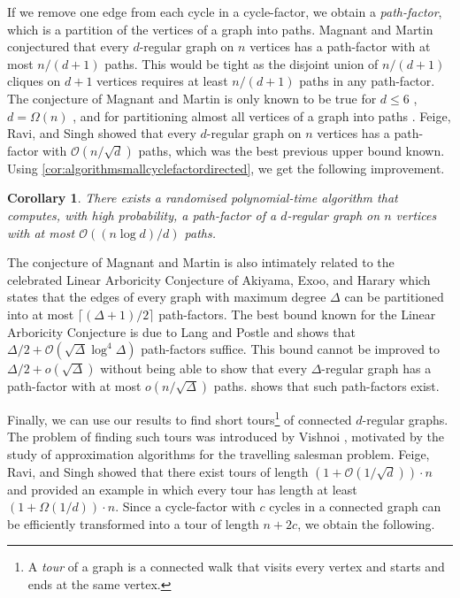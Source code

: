 \documentclass[11pt]{article}
\theoremstyle{plain}
\newtheorem{corollary}[theorem]{Corollary}
\theoremstyle{definition}
\newcommand{\cO}{\mathcal O}
\begin{document}
If we remove one edge from each cycle in a cycle-factor, we obtain a \emph{path-factor}, which is a partition of the vertices of a graph into paths. Magnant and Martin \cite{magnant2009note} conjectured that every $d$-regular graph on $n$ vertices has a path-factor with at most $n/(d+1)$ paths. This would be tight as the disjoint union of $n/(d+1)$ cliques on $d+1$ vertices requires at least $n/(d+1)$ paths in any path-factor. The conjecture of Magnant and Martin is only known to be true for $d \le 6$ \cite{magnant2009note,feige2022path}, $d = \Omega(n)$ \cite{gruslys2021cycle}, and for partitioning almost all vertices of a graph into paths \cite{montgomery2024approximate,letzter2025nearly}. Feige, Ravi, and Singh \cite{feige2014short} showed that every $d$-regular graph on $n$ vertices has a path-factor with $\cO(n/\!\sqrt{d})$ paths, which was the best previous upper bound known. Using \cref{cor:algorithmsmallcyclefactordirected}, we get the following improvement.

\begin{corollary}\label{thm:smallpathfactor}
    There exists a randomised polynomial-time algorithm that computes, with high probability, a path-factor of a $d$-regular graph on $n$ vertices with at most $\cO((n\log d)/d)$ paths.
\end{corollary}

The conjecture of Magnant and Martin is also intimately related to the celebrated Linear Arboricity Conjecture of Akiyama, Exoo, and Harary \cite{akiyama1980covering} which states that the edges of every graph with maximum degree $\Delta$ can be partitioned into at most $\lceil (\Delta+1)/2 \rceil$ path-factors. The best bound known for the Linear Arboricity Conjecture is due to Lang and Postle \cite{lang2023improved} and shows that $\Delta/2 + \cO(\sqrt{\Delta} \log^4 \Delta)$ path-factors suffice. This bound cannot be improved to $\Delta/2 + o(\sqrt{\Delta})$ without being able to show that every $\Delta$-regular graph has a path-factor with at most $o(n/\!\sqrt{\Delta})$ paths.  shows that such path-factors exist.
 
Finally, we can use our results to find short tours\footnote{A \emph{tour} of a graph is a connected walk that visits every vertex and starts and ends at the same vertex.} of connected $d$-regular graphs. The problem of finding such tours was introduced by Vishnoi \cite{vishnoi2012permanent}, motivated by the study of approximation algorithms for the travelling salesman problem. Feige, Ravi, and Singh \cite{feige2014short} showed that there exist tours of length $(1+\cO(1/\!\sqrt{d})) \cdot n$ and provided an example in which every tour has length at least $(1+\Omega(1/d)) \cdot n$. Since a cycle-factor with $c$ cycles in a connected graph can be efficiently transformed into a tour of length $n + 2 c$, we obtain the following.
\end{document}
